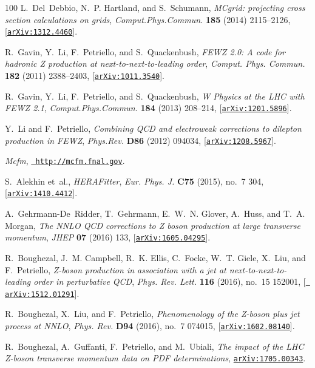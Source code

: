 \begin{thebibliography}{100}
L.~Del~Debbio, N.~P. Hartland, and S.~Schumann, {\it {MCgrid: projecting cross
  section calculations on grids}},  {\em Comput.Phys.Commun.} {\bf 185} (2014)
  2115--2126, [\href{http://arxiv.org/abs/1312.4460}{{\tt arXiv:1312.4460}}].

R.~Gavin, Y.~Li, F.~Petriello, and S.~Quackenbush, {\it {FEWZ 2.0: A code for
  hadronic Z production at next-to-next-to-leading order}},  {\em Comput. Phys.
  Commun.} {\bf 182} (2011) 2388--2403,
  [\href{http://arxiv.org/abs/1011.3540}{{\tt arXiv:1011.3540}}].

R.~Gavin, Y.~Li, F.~Petriello, and S.~Quackenbush, {\it {W Physics at the LHC
  with FEWZ 2.1}},  {\em Comput.Phys.Commun.} {\bf 184} (2013) 208--214,
  [\href{http://arxiv.org/abs/1201.5896}{{\tt arXiv:1201.5896}}].

Y.~Li and F.~Petriello, {\it {Combining QCD and electroweak corrections to
  dilepton production in FEWZ}},  {\em Phys.Rev.} {\bf D86} (2012) 094034,
  [\href{http://arxiv.org/abs/1208.5967}{{\tt arXiv:1208.5967}}].

{\it Mcfm},  \href{http://arxiv.org/abs/http://mcfm.fnal.gov}{{\tt
  http://mcfm.fnal.gov}}.

S.~Alekhin et~al., {\it {HERAFitter}},  {\em Eur. Phys. J.} {\bf C75} (2015),
  no.~7 304, [\href{http://arxiv.org/abs/1410.4412}{{\tt arXiv:1410.4412}}].

A.~Gehrmann-De~Ridder, T.~Gehrmann, E.~W.~N. Glover, A.~Huss, and T.~A. Morgan,
  {\it {The NNLO QCD corrections to Z boson production at large transverse
  momentum}},  {\em JHEP} {\bf 07} (2016) 133,
  [\href{http://arxiv.org/abs/1605.04295}{{\tt arXiv:1605.04295}}].

R.~Boughezal, J.~M. Campbell, R.~K. Ellis, C.~Focke, W.~T. Giele, X.~Liu, and
  F.~Petriello, {\it {Z-boson production in association with a jet at
  next-to-next-to-leading order in perturbative QCD}},  {\em Phys. Rev. Lett.}
  {\bf 116} (2016), no.~15 152001, [\href{http://arxiv.org/abs/1512.01291}{{\tt
  arXiv:1512.01291}}].

R.~Boughezal, X.~Liu, and F.~Petriello, {\it {Phenomenology of the Z-boson plus
  jet process at NNLO}},  {\em Phys. Rev.} {\bf D94} (2016), no.~7 074015,
  [\href{http://arxiv.org/abs/1602.08140}{{\tt arXiv:1602.08140}}].

R.~Boughezal, A.~Guffanti, F.~Petriello, and M.~Ubiali, {\it {The impact of the
  LHC Z-boson transverse momentum data on PDF determinations}},
  \href{http://arxiv.org/abs/1705.00343}{{\tt arXiv:1705.00343}}.


\end{thebibliography}
